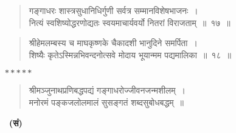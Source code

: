 {\begin{verse}
गङ्गाधरः शास्त्रसुधानिधिर्गुणी सर्वत्र सम्मानविशेषभाजनः~।\\
नित्यं स्वशिष्योद्धरणोद्यतः स्वयमाचार्यवर्यो नितरां विराजताम्~॥~१७~॥
\end{verse}

\begin{verse}
श्रीहेमलम्बस्य च माघकृष्णके चैकादशी भानुदिने समर्पिता~।\\
शिष्यैः कृतेऽस्मिन्नभिवन्दनोत्सवे मोदाय भूयान्मम पद्यमालिका~॥~१८~॥
\end{verse}

\centerline{$*****$}

\begin{verse}
श्रीमञ्जुनाथप्रणिबद्धपद्यं गङ्गाधरोज्जीवनजन्मशीलम्~।\\
मनोरमं पङ्कजलोलमालं सुसङ्गतं शब्दसुबोधबद्धम्~॥
\end{verse}


~\hfill\textbf{(सं)}\hspace{3cm}

\articleend
}
